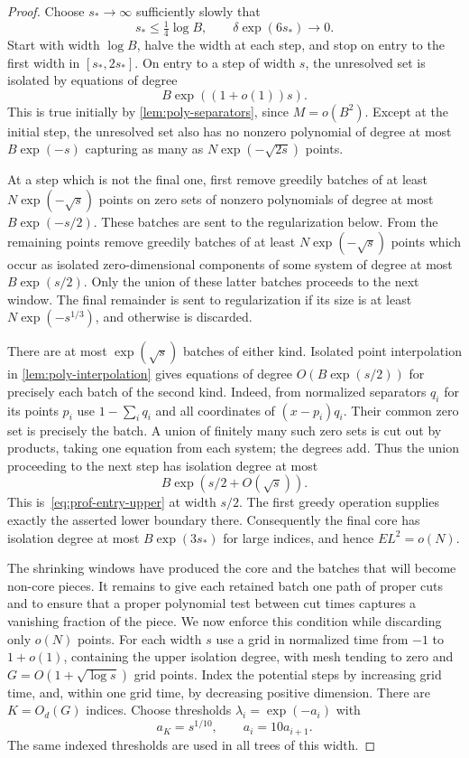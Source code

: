 \begin{proof}
Choose $s_*\to\infty$ sufficiently slowly that
\[
 s_*\le\tfrac14\log B,\qquad \delta\exp(6s_*)\longrightarrow0.
\]
Start with width $\log B$, halve the width at each step, and stop on entry to the first width in $[s_*,2s_*]$.  On entry to a step of width $s$, the unresolved set is isolated by equations of degree
\begin{equation}\label{eq:prof-entry-upper}
 B\exp((1+o(1))s).
\end{equation}
This is true initially by \cref{lem:poly-separators}, since $M=o(B^2)$.  Except at the initial step, the unresolved set also has no nonzero polynomial of degree at most $B\exp(-s)$ capturing as many as $N\exp(-\sqrt{2s})$ points.

At a step which is not the final one, first remove greedily batches of at least $N\exp(-\sqrt{s})$ points on zero sets of nonzero polynomials of degree at most $B\exp(-s/2)$.  These batches are sent to the regularization below.  From the remaining points remove greedily batches of at least $N\exp(-\sqrt{s})$ points which occur as isolated zero-dimensional components of some system of degree at most $B\exp(s/2)$.  Only the union of these latter batches proceeds to the next window.  The final remainder is sent to regularization if its size is at least $N\exp(-s^{1/3})$, and otherwise is discarded.

There are at most $\exp(\sqrt{s})$ batches of either kind.  Isolated point interpolation in \cref{lem:poly-interpolation} gives equations of degree $O(B\exp(s/2))$ for precisely each batch of the second kind. Indeed, from normalized separators $q_i$ for its points $p_i$ use $1-\sum_iq_i$ and all coordinates of $(x-p_i)q_i$.  Their common zero set is precisely the batch.  A union of finitely many such zero sets is cut out by products, taking one equation from each system; the degrees add.  Thus the union proceeding to the next step has isolation degree at most
\[
 B\exp(s/2+O(\sqrt{s})).
\]
This is~\eqref{eq:prof-entry-upper} at width $s/2$.  The first greedy operation supplies exactly the asserted lower boundary there. Consequently the final core has isolation degree at most $B\exp(3s_*)$ for large indices, and hence $EL^2=o(N)$.

The shrinking windows have produced the core and the batches that will become non-core pieces.  It remains to give each retained batch one path of proper cuts and to ensure that a proper polynomial test between cut times captures a vanishing fraction of the piece.  We now enforce this condition while discarding only $o(N)$ points. For each width $s$ use a grid in normalized time from $-1$ to $1+o(1)$, containing the upper isolation degree, with mesh tending to zero and $G=O(1+\sqrt{\log s})$ grid points.  Index the potential steps by increasing grid time, and, within one grid time, by decreasing positive dimension.  There are $K=O_d(G)$ indices.  Choose thresholds $\lambda_i=\exp(-a_i)$ with
\begin{equation}\label{eq:prof-lambda-hierarchy}
 a_K=s^{1/10},\qquad a_i=10a_{i+1}.
\end{equation}
The same indexed thresholds are used in all trees of this width.


\end{proof}
